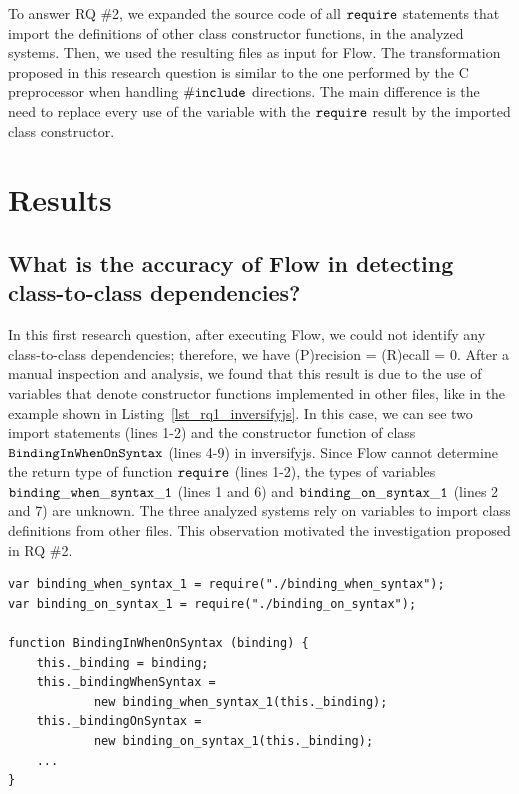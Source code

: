 \documentclass[review]{elsarticle}
\newcommand{\mcode}[1]{$\tt #1$}
\begin{document}
To answer RQ \#2, we expanded the source code of all \mcode{require} statements that import the definitions of other class constructor functions, in the analyzed systems. Then, we used the resulting files as input for Flow. The transformation proposed in this research question is similar to the one performed by the C preprocessor when handling \mcode{\#include} directions. The main difference is the need to replace every use of the variable with the \mcode{require} result by the imported class constructor.


\section{Results}
\label{sec:results}

\subsection{What is the accuracy of Flow in detecting class-to-class dependencies?}
\label{sec:rq1}

In this first research question, after executing Flow, we could not identify any class-to-class dependencies; therefore, we have (P)recision = (R)ecall = 0. After a manual inspection and analysis, we found that this result is due to the use of variables that denote constructor functions implemented in other files, like in the example shown in Listing~\ref{lst_rq1_inversifyjs}. In this case, we can see two import statements (lines 1-2) and the constructor function of class \mcode{BindingInWhenOnSyntax} (lines 4-9) in {\sc inversifyjs}. Since Flow cannot determine the return type of function \mcode{require} (lines 1-2), the types of variables \mcode{binding\_when\_syntax\_1} (lines 1 and 6) and \mcode{binding\_on\_syntax\_1} (lines 2 and 7) are unknown. The three analyzed systems rely on variables to import class definitions from other files. This observation motivated the investigation proposed in RQ \#2.


\begin{lstlisting}[caption=JavaScript code using variables denoting constructor functions in {\sc inversifyjs}, label=lst_rq1_inversifyjs, emph={[2]binding_when_syntax_1, binding_on_syntax_1},emphstyle={[2]\ttfamily\bfseries\color{darkgreen}}]
var binding_when_syntax_1 = require("./binding_when_syntax");
var binding_on_syntax_1 = require("./binding_on_syntax");

function BindingInWhenOnSyntax (binding) {
	this._binding = binding;
	this._bindingWhenSyntax = 
			new binding_when_syntax_1(this._binding);
	this._bindingOnSyntax = 
			new binding_on_syntax_1(this._binding);
	...
}
\end{lstlisting} 
\end{document}

